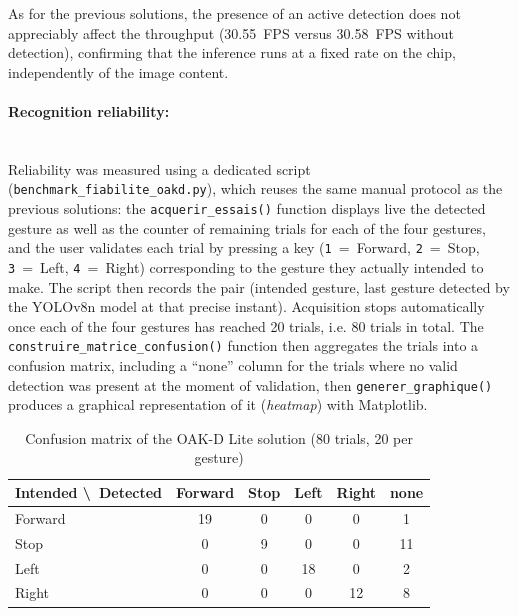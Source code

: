 \documentclass[12pt,a4paper]{report}
\begin{document}
	As for the previous solutions, the presence of an active detection does not appreciably affect the throughput (30.55~FPS versus 30.58~FPS without detection), confirming that the inference runs at a fixed rate on the chip, independently of the image content.
	
	
	\paragraph{Recognition reliability:} \mbox{} \\
	Reliability was measured using a dedicated script (\texttt{benchmark\_fiabilite\_oakd.py}), which reuses the same manual protocol as the previous solutions: the \texttt{acquerir\_essais()} function displays live the detected gesture as well as the counter of remaining trials for each of the four gestures, and the user validates each trial by pressing a key (\texttt{1}~=~Forward, \texttt{2}~=~Stop, \texttt{3}~=~Left, \texttt{4}~=~Right) corresponding to the gesture they actually intended to make. The script then records the pair (intended gesture, last gesture detected by the YOLOv8n model at that precise instant). Acquisition stops automatically once each of the four gestures has reached 20 trials, i.e. 80 trials in total. The \texttt{construire\_matrice\_confusion()} function then aggregates the trials into a confusion matrix, including a ``none'' column for the trials where no valid detection was present at the moment of validation, then \texttt{generer\_graphique()} produces a graphical representation of it (\textit{heatmap}) with Matplotlib.
	
	\begin{table}[H]
		\centering
		\small
		\begin{tabular}{lccccc}
			\toprule
			\textbf{Intended \textbackslash\ Detected} & \textbf{Forward} & \textbf{Stop} & \textbf{Left} & \textbf{Right} & \textbf{none} \\
			\midrule
			Forward & 19 & 0 & 0 & 0 & 1 \\
			Stop & 0 & 9 & 0 & 0 & 11 \\
			Left & 0 & 0 & 18 & 0 & 2 \\
			Right & 0 & 0 & 0 & 12 & 8 \\
			\bottomrule
		\end{tabular}
		\caption{Confusion matrix of the OAK-D Lite solution (80 trials, 20 per gesture)}
		\label{tab:confusion-oakd}
	\end{table}
	
\end{document}
